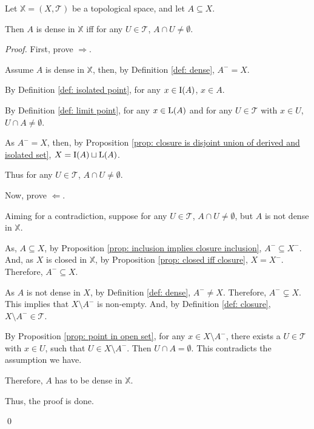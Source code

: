 \begin{proposition}
	\label{prop: alternative definition of dense}
	Let $\mathbb X = (X, \mathcal T)$ be a topological space, and let $A \subseteq X$.
	
	Then $A$ is dense in $\mathbb X$ iff for any $U \in \mathcal T$, $A \cap U \ne \emptyset$.
	
	\begin{proof}
		First, prove $\Rightarrow$.
		
		Assume $A$ is dense in $\mathbb X$, then, by Definition \ref{def: dense}, $A^- = X$.
		
		By Definition \ref{def: isolated point}, for any $x \in \mathrm{I}(A)$, $x \in A$.
		
		By Definition \ref{def: limit point}, for any $x \in \mathrm{L}(A)$ and for any $U \in \mathcal T$ with $x \in U$, $U \cap A \ne \emptyset$.
		
		As $A^- = X$, then, by Proposition \ref{prop: closure is disjoint union of derived and isolated set}, $X = \mathrm{I}(A) \sqcup \mathrm{L} (A)$.
		
		Thus for any $U \in \mathcal T$, $A \cap U \ne \emptyset$.
		
		\qedlm
		
		Now, prove $\Leftarrow$.
		
		Aiming for a contradiction, suppose for any $U \in \mathcal T$, $A \cap U \ne \emptyset$, but $A$ is not dense in $\mathbb X$.
		
		As, $A \subseteq X$, by Proposition \ref{prop: inclusion implies closure inclusion}, $A^- \subseteq X^-$. And, as $X$ is closed in $\mathbb X$, by Proposition \ref{prop: closed iff closure}, $X = X^-$. Therefore, $A^- \subseteq X$.
		
		As $A$ is not dense in $X$, by Definition \ref{def: dense}, $A^- \ne X$. Therefore, $A^- \subsetneq X$. This implies that $X \setminus A^-$ is non-empty. And, by Definition \ref{def: closure}, $X \setminus A^- \in \mathcal T$.
		
		By Proposition \ref{prop: point in open set}, for any $x \in X \setminus A^-$, there exists a $U \in \mathcal T$ with $x \in U$, such that $U \in X \setminus A^-$. Then $U \cap A = \emptyset$. This contradicts the assumption we have.
		
		Therefore, $A$ has to be dense in $\mathbb X$.
		
		\qedlm
		
		Thus, the proof is done.
		
		\qed
	\end{proof}
\end{proposition}



